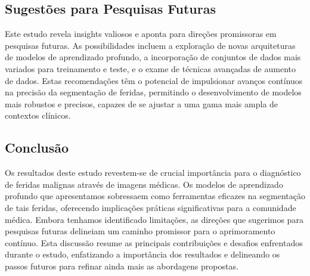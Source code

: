 \subsection{Sugestões para Pesquisas Futuras}

Este estudo revela insights valiosos e aponta para direções promissoras em pesquisas futuras. As possibilidades incluem a exploração de novas arquiteturas de modelos de aprendizado profundo, a incorporação de conjuntos de dados mais variados para treinamento e teste, e o exame de técnicas avançadas de aumento de dados. Estas recomendações têm o potencial de impulsionar avanços contínuos na precisão da segmentação de feridas, permitindo o desenvolvimento de modelos mais robustos e precisos, capazes de se ajustar a uma gama mais ampla de contextos clínicos.


\subsection{Conclusão}

Os resultados deste estudo revestem-se de crucial importância para o diagnóstico de feridas malignas através de imagens médicas. Os modelos de aprendizado profundo que apresentamos sobressaem como ferramentas eficazes na segmentação de tais feridas, oferecendo implicações práticas significativas para a comunidade médica. Embora tenhamos identificado limitações, as direções que sugerimos para pesquisas futuras delineiam um caminho promissor para o aprimoramento contínuo. Esta discussão resume as principais contribuições e desafios enfrentados durante o estudo, enfatizando a importância dos resultados e delineando os passos futuros para refinar ainda mais as abordagens propostas.

